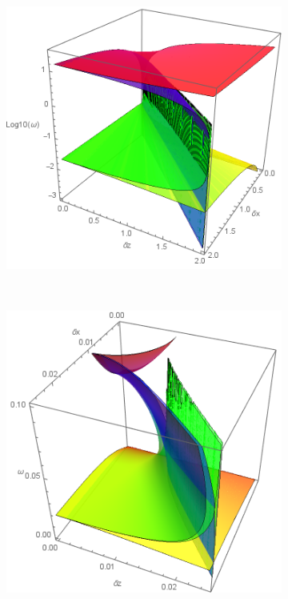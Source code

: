 \documentclass[a4paper,11pt]{article}
\begin{document}
\begin{figure}[!h]
	\centering		
	\begin{subfigure}{0.45\linewidth}
		\includegraphics[width=1\linewidth]{FIGURES/Fig_omega.png}
		\caption{}
	\end{subfigure}
	~
	\centering		
	\begin{subfigure}{0.45\linewidth}
		\includegraphics[width=1\linewidth]{FIGURES/Fig_omega_zoom.png}

\end{subfigure}
\end{figure}
\end{document}
